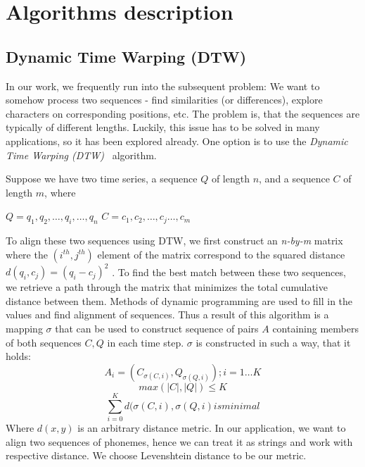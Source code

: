 \section{Algorithms description}
\subsection{Dynamic Time Warping (DTW)}
In our work, we frequently run into the subsequent problem:
We want to somehow process two sequences - find similarities (or differences), explore characters on corresponding positions, etc.
The problem is, that the sequences are typically of different lengths.
Luckily, this issue has to be solved in many applications, so it has been explored already.
One option is to use the \textit{Dynamic Time Warping (DTW)}~\cite{ratanamahatana2004everything} algorithm.
\par
Suppose we have two time series, a sequence $Q$ of length $n$,
and a sequence $C$ of length $m$, where
\begin{center}
$Q = q_1 ,q_2 ,\dots, q_i ,\dots ,q_n$
\linebreak
$C = c_1 ,c_2 ,\dots, c_j \dots, c_m$
\end{center}
To align these two sequences using DTW, we first construct an \textit{n-by-m} matrix where the $(i^{th} , j^{th} )$ element of the matrix correspond to the squared distance $d(q_i, c_j) =
(q_i - c_j)^2$ .
To find the best match between these two sequences, we retrieve a path through the matrix that minimizes the total cumulative distance between them.
Methods of dynamic programming are used to fill in the values and find alignment of sequences.
Thus a result of this algorithm is a mapping $\sigma$ that can be used to construct sequence of pairs $A$ containing members of both sequences $C,Q$ in each time step.
$\sigma$ is constructed in such a way, that it holds:
\begin{equation}
A_i = (C_{\sigma (C,i)}, Q_{\sigma (Q, i)}); i = 1 \dots K
\end{equation} 
\begin{equation}
max(|C|,|Q|) \le K
\end{equation}
\begin{equation}
\sum_{i=0}^K d(\sigma (C,i), \sigma(Q,i) is minimal
\end{equation}
Where $d(x,y)$ is an arbitrary distance metric.
In our application, we want to align two sequences of phonemes, hence we can treat it as strings and work with respective distance.
We choose Levenshtein distance to be our metric.
